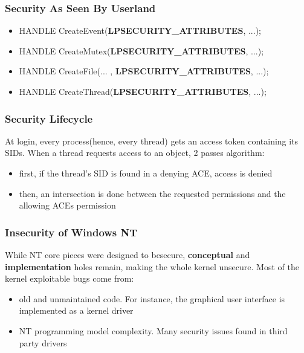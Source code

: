 \begin{frame}[containsverbatim]
  \frametitle{Security As Seen By Userland}

  \begin{itemize}
    \item
      HANDLE CreateEvent(\textbf{LPSECURITY\_ATTRIBUTES}, ...);
    \item
      HANDLE CreateMutex(\textbf{LPSECURITY\_ATTRIBUTES}, ...);
    \item
      HANDLE CreateFile(... , \textbf{LPSECURITY\_ATTRIBUTES}, ...);
    \item
      HANDLE CreateThread(\textbf{LPSECURITY\_ATTRIBUTES}, ...);
  \end{itemize}

\end{frame}


\begin{frame}
  \frametitle{Security Lifecycle}

  At login, every process(hence, every thread) gets an access token containing its SIDs.
  When a thread requests access to an object, 2 passes algorithm:

  \begin{itemize}
    \item
      first, if the thread's SID is found in a denying ACE, access is denied
    \item
      then, an intersection is done between the requested permissions and the allowing ACEs permission
  \end{itemize}
\end{frame}


\begin{frame}
  \frametitle{Insecurity of Windows NT}

  While NT core pieces were designed to besecure, \textbf{conceptual} and \textbf{implementation}
  holes remain, making the whole kernel unsecure. Most of the kernel exploitable bugs come from:

  \begin{itemize}
    \item
      old and unmaintained code. For instance, the graphical user interface is implemented as a kernel driver
    \item
      NT programming model complexity. Many security issues found in third party drivers
  \end{itemize}

\end{frame}


